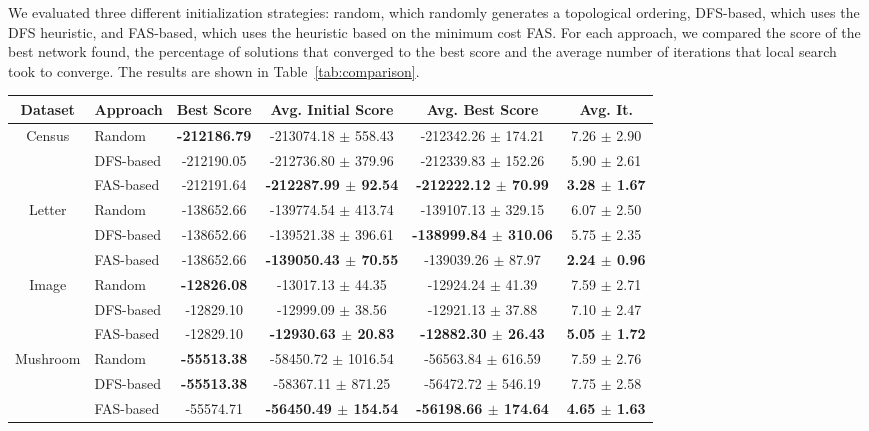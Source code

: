 We evaluated three different initialization strategies: random, which randomly generates a topological ordering, DFS-based, which uses the DFS heuristic, and FAS-based, which uses the heuristic based on the minimum cost FAS. For each approach, we compared the score of the best network found, the percentage of solutions that converged to the best score and the average number of iterations that local search took to converge. The results are shown in Table~\ref{tab:comparison}.
	\begin{table}[ h ]
		\centering
		\begin{tabular}{| c | l | c | c | c | c | }
			\hline
			Dataset & Approach & Best Score & Avg. Initial Score & Avg. Best Score & Avg. It. \\ \hline
			\multirow{3}{*}{Census} & Random & \textbf{-212186.79} & -213074.18 $\pm$ 558.43 & -212342.26 $\pm$ 174.21 & 7.26 $\pm$ 2.90 \\ \cline{2-6} 
					& DFS-based & -212190.05 & -212736.80 $\pm$ 379.96 & -212339.83 $\pm$ 152.26 & 5.90 $\pm$ 2.61 \\ \cline{2-6}
					& FAS-based & -212191.64 & \textbf{-212287.99 $\pm$ 92.54} & \textbf{-212222.12 $\pm$ 70.99} & \textbf{3.28 $\pm$ 1.67} \\ \hline

			\multirow{3}{*}{Letter} & Random & -138652.66 & -139774.54 $\pm$ 413.74 & -139107.13 $\pm$ 329.15 & 6.07 $\pm$ 2.50 \\ \cline{2-6} 
					& DFS-based & -138652.66 & -139521.38 $\pm$ 396.61 & \textbf{-138999.84 $\pm$ 310.06} & 5.75 $\pm$ 2.35 \\ \cline{2-6}
					& FAS-based & -138652.66 & \textbf{-139050.43 $\pm$ 70.55} & -139039.26 $\pm$ 87.97 & \textbf{2.24 $\pm$ 0.96} \\ \hline

			\multirow{3}{*}{Image} & Random & \textbf{-12826.08} & -13017.13 $\pm$ 44.35 & -12924.24 $\pm$ 41.39 & 7.59 $\pm$ 2.71 \\ \cline{2-6} 
					& DFS-based & -12829.10 & -12999.09 $\pm$ 38.56 & -12921.13 $\pm$ 37.88 & 7.10 $\pm$ 2.47 \\ \cline{2-6}
					& FAS-based & -12829.10 & \textbf{-12930.63 $\pm$ 20.83} & \textbf{-12882.30 $\pm$ 26.43} & \textbf{5.05 $\pm$ 1.72} \\ \hline

			\multirow{3}{*}{Mushroom} & Random & \textbf{-55513.38} & -58450.72 $\pm$ 1016.54 & -56563.84 $\pm$ 616.59 & 7.59 $\pm$ 2.76 \\ \cline{2-6} 
					& DFS-based & \textbf{-55513.38} & -58367.11 $\pm$ 871.25 & -56472.72 $\pm$ 546.19 & 7.75 $\pm$ 2.58 \\ \cline{2-6}
					& FAS-based & -55574.71 & \textbf{-56450.49 $\pm$ 154.54} & \textbf{-56198.66 $\pm$ 174.64} & \textbf{4.65 $\pm$ 1.63} \\ \hline


\end{tabular}
\end{table}
